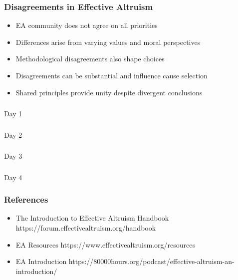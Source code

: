 \begin{frame}[fragile]\frametitle{Disagreements in Effective Altruism}
      \begin{itemize}
        \item EA community does not agree on all priorities
        \item Differences arise from varying values and moral perspectives
        \item Methodological disagreements also shape choices
        \item Disagreements can be substantial and influence cause selection
        \item Shared principles provide unity despite divergent conclusions
      \end{itemize}
\end{frame}
\begin{frame}[fragile]\frametitle{}
\begin{center}
{\Large Day 1}
\end{center}
\end{frame}

\begin{frame}[fragile]\frametitle{}
\begin{center}
{\Large Day 2}
\end{center}
\end{frame}


\begin{frame}[fragile]\frametitle{}
\begin{center}
{\Large Day 3}
\end{center}
\end{frame}



\begin{frame}[fragile]\frametitle{}
\begin{center}
{\Large Day 4}
\end{center}
\end{frame}

\begin{frame}[fragile]\frametitle{References}
  \begin{itemize}
    \item The Introduction to Effective Altruism Handbook https://forum.effectivealtruism.org/handbook
	\item EA Resources https://www.effectivealtruism.org/resources
	\item EA Introduction https://80000hours.org/podcast/effective-altruism-an-introduction/
  \end{itemize}

\end{frame}
